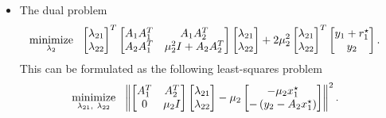 \documentclass[12pt]{article}
\begin{document}
\begin{itemize}
\item The dual problem
%
\begin{align}
\mathop{\mbox{minimize}}_{\lambda_{2}} \ \  &
\begin{bmatrix} \lambda_{21} \\ \lambda_{22} \end{bmatrix}^T
\begin{bmatrix} A_1A_1^T & A_1A_2^T \\ A_2A_1^T & \mu_2^2 I+A_2A_2^T \end{bmatrix}
\begin{bmatrix} \lambda_{21} \\ \lambda_{22} \end{bmatrix} +
2\mu_2^2
\begin{bmatrix} \lambda_{21} \\ \lambda_{22} \end{bmatrix}^T \begin{bmatrix} y_1+r_1^{\star} \\ y_2 \end{bmatrix}.
\end{align}
%
This can be formulated as the following least-squares problem
%
\begin{align}
  \mathop{\mbox{minimize}}_{\lambda_{21},\ \lambda_{22}} \ \  & \left\lVert\begin{bmatrix}A_1^T & A_2^T \\ 0 & \mu_2I \end{bmatrix}
    \begin{bmatrix} \lambda_{21} \\ \lambda_{22} \end{bmatrix} -
    \mu_2\begin{bmatrix} -\mu_2 x_1^{\star} \\ -\left(y_2 - A_2x_1^{\star}\right) \end{bmatrix}\right\rVert^2.
\end{align}

\end{itemize}
\end{document}
